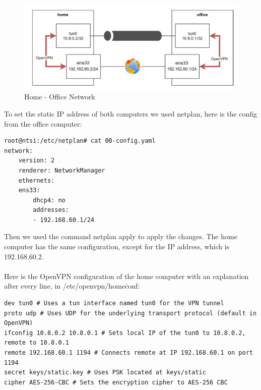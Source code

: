
\begin{figure}[H]
	\centering
	\includegraphics[width=0.8\linewidth]{Figures/home-office.png}
	\caption{Home - Office Network}
\end{figure}

To set the static IP address of both computers we used netplan, here is the config from the office computer:

\begin{verbatim}
root@ntsi:/etc/netplan# cat 00-config.yaml 
network:
    version: 2
    renderer: NetworkManager
    ethernets:
    ens33:
        dhcp4: no
        addresses:
        - 192.168.60.1/24
\end{verbatim}

Then we used the command netplan apply to apply the changes. The home computer has the same configuration, except for the IP address, which is 192.168.60.2.
\\\\
Here is the OpenVPN configuration of the home computer with an explanation after every line, in /etc/openvpn/home\.conf:

\begin{verbatim}
dev tun0 # Uses a tun interface named tun0 for the VPN tunnel
proto udp # Uses UDP for the underlying transport protocol (default in OpenVPN)
ifconfig 10.8.0.2 10.8.0.1 # Sets local IP of the tun0 to 10.8.0.2, remote to 10.8.0.1
remote 192.168.60.1 1194 # Connects remote at IP 192.168.60.1 on port 1194
secret keys/static.key # Uses PSK located at keys/static
cipher AES-256-CBC # Sets the encryption cipher to AES-256 CBC
\end{verbatim}

